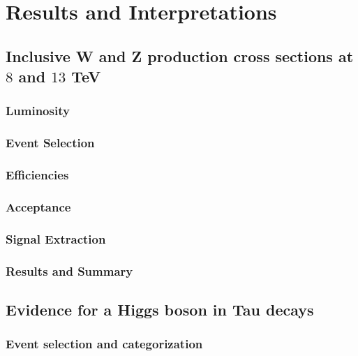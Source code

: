 \chapter{Results and Interpretations}

\section{Inclusive W and Z production cross sections at $8$ and $13$ TeV}

\subsection{Luminosity}

\subsection{Event Selection}

\subsection{Efficiencies}

\subsection{Acceptance}

\subsection{Signal Extraction}

\subsection{Results and Summary}

\section{Evidence for a Higgs boson in Tau decays}

\subsection{Event selection and categorization}

